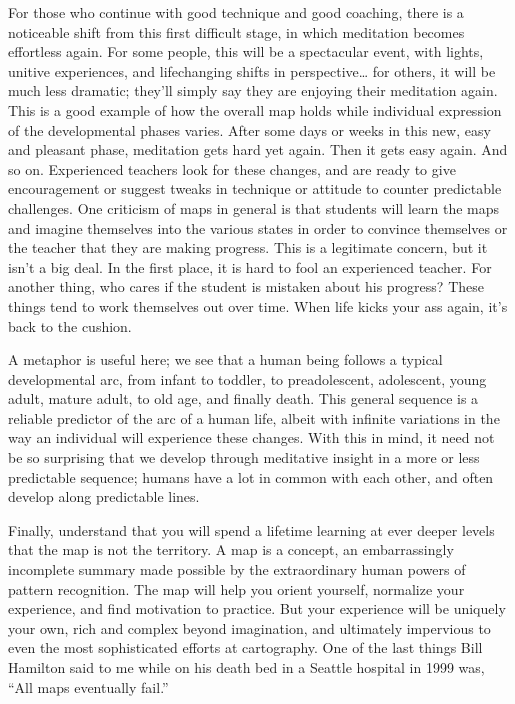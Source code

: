\documentclass[a5paper,10pt,english]{book}
\begin{document}
\sphinxAtStartPar
For those who continue with good technique and good coaching, there is a
noticeable shift from this first difficult stage, in which meditation
becomes effortless again. For some people, this will be a spectacular
event, with lights, unitive experiences, and life\sphinxhyphen{}changing shifts in
perspective… for others, it will be much less dramatic; they’ll simply
say they are enjoying their meditation again. This is a good example of
how the overall map holds while individual expression of the
developmental phases varies. After some days or weeks in this new, easy
and pleasant phase, meditation gets hard yet again. Then it gets easy
again. And so on. Experienced teachers look for these changes, and are
ready to give encouragement or suggest tweaks in technique or attitude
to counter predictable challenges. One criticism of maps in general is
that students will learn the maps and imagine themselves into the
various states in order to convince themselves or the teacher that they
are making progress. This is a legitimate concern, but it isn’t a big
deal. In the first place, it is hard to fool an experienced teacher. For
another thing, who cares if the student is mistaken about his progress?
These things tend to work themselves out over time. When life kicks your
ass again, it’s back to the cushion.

\sphinxAtStartPar
A metaphor is useful here; we see that a human being follows a typical
developmental arc, from infant to toddler, to pre\sphinxhyphen{}adolescent,
adolescent, young adult, mature adult, to old age, and finally death.
This general sequence is a reliable predictor of the arc of a human
life, albeit with infinite variations in the way an individual will
experience these changes. With this in mind, it need not be so
surprising that we develop through meditative insight in a more or less
predictable sequence; humans have a lot in common with each other, and
often develop along predictable lines.

\sphinxAtStartPar
Finally, understand that you will spend a lifetime learning at ever
deeper levels that the map is not the territory. A map is a concept, an
embarrassingly incomplete summary made possible by the extraordinary
human powers of pattern recognition. The map will help you orient
yourself, normalize your experience, and find motivation to practice.
But your experience will be uniquely your own, rich and complex beyond
imagination, and ultimately impervious to even the most sophisticated
efforts at cartography. One of the last things Bill Hamilton said to me
while on his death bed in a Seattle hospital in 1999 was, “All maps
eventually fail.”
\end{document}
